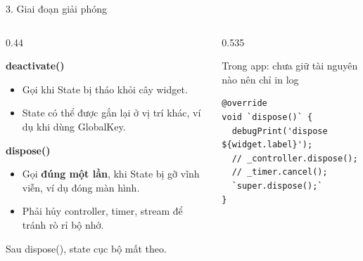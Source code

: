 \documentclass[aspectratio=169,11pt]{beamer}
\newcommand{\ma}[1]{{\ttfamily\small #1}}
\newcommand{\chot}[1]{%
  \par\vspace{2.5mm}%
  \colorbox{nenhop}{\parbox{\dimexpr\linewidth-2\fboxsep\relax}{\raggedright\small\color{chinh}#1}}}
\newcommand{\ham}[1]{\par{\color{chinh}\bfseries\ttfamily\small #1}\par\vspace{0.3mm}}
\newcommand{\nhanma}[1]{{\scriptsize\color{xam}#1\par}\vspace{0.8mm}}
\begin{document}
\begin{frame}[fragile]{3. Giai đoạn giải phóng}
  \begin{columns}[T,onlytextwidth]
    \begin{column}{0.44\textwidth}
      \small
      \ham{deactivate()}
      \begin{itemize}\setlength{\itemsep}{0.3mm}
        \item Gọi khi State bị tháo khỏi cây widget.
        \item State có thể được gắn lại ở vị trí khác, ví dụ khi dùng \ma{GlobalKey}.
      \end{itemize}
      \ham{dispose()}
      \begin{itemize}\setlength{\itemsep}{0.3mm}
        \item Gọi \textbf{đúng một lần}, khi State bị gỡ vĩnh viễn, ví dụ đóng màn hình.
        \item Phải hủy controller, timer, stream để tránh rò rỉ bộ nhớ.
      \end{itemize}
      \chot{Sau \ma{dispose()}, state cục bộ mất theo.}
    \end{column}
    \begin{column}{0.535\textwidth}
      \nhanma{Trong app: chưa giữ tài nguyên nào nên chỉ in log}
\begin{lstlisting}
@override
void `dispose()` {
  debugPrint('dispose ${widget.label}');
  // _controller.dispose();
  // _timer.cancel();
  `super.dispose();`
}
\end{lstlisting}
    \end{column}
  \end{columns}
\end{frame}

\end{document}
